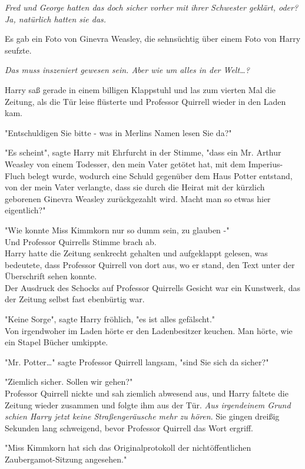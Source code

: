 {\emph{Fred und George hatten das doch sicher vorher mit ihrer Schwester geklärt, oder? Ja, natürlich hatten sie das.}

Es gab ein Foto von Ginevra Weasley, die sehnsüchtig über einem Foto von Harry seufzte.

\emph{Das muss inszeniert gewesen sein. Aber wie um alles in der Welt…?}

Harry saß gerade in einem billigen Klappstuhl und las zum vierten Mal die Zeitung, als die Tür leise flüsterte und Professor Quirrell wieder in den Laden kam.

"Entschuldigen Sie bitte - was in Merlins Namen lesen Sie da?"

"Es scheint", sagte Harry mit Ehrfurcht in der Stimme, "dass ein Mr. Arthur Weasley von einem Todesser, den mein Vater getötet hat, mit dem Imperius-Fluch belegt wurde, wodurch eine Schuld gegenüber dem Haus Potter entstand, von der mein Vater verlangte, dass sie durch die Heirat mit der kürzlich geborenen Ginevra Weasley zurückgezahlt wird. Macht man so etwas hier eigentlich?"

"Wie konnte Miss Kimmkorn nur so dumm sein, zu glauben -"\\ Und Professor Quirrells Stimme brach ab.\\ Harry hatte die Zeitung senkrecht gehalten und aufgeklappt gelesen, was bedeutete, dass Professor Quirrell von dort aus, wo er stand, den Text unter der Überschrift sehen konnte.\\ Der Ausdruck des Schocks auf Professor Quirrells Gesicht war ein Kunstwerk, das der Zeitung selbst fast ebenbürtig war.

"Keine Sorge", sagte Harry fröhlich, "es ist alles gefälscht."\\ Von irgendwoher im Laden hörte er den Ladenbesitzer keuchen. Man hörte, wie ein Stapel Bücher umkippte.

"Mr. Potter…" sagte Professor Quirrell langsam, "sind Sie sich da sicher?"

"Ziemlich sicher. Sollen wir gehen?"\\ Professor Quirrell nickte und sah ziemlich abwesend aus, und Harry faltete die Zeitung wieder zusammen und folgte ihm aus der Tür. \emph{Aus irgendeinem Grund schien Harry jetzt keine Straßengeräusche mehr zu hören}. Sie gingen dreißig Sekunden lang schweigend, bevor Professor Quirrell das Wort ergriff.

"Miss Kimmkorn hat sich das Originalprotokoll der nichtöffentlichen Zaubergamot-Sitzung angesehen."

}
